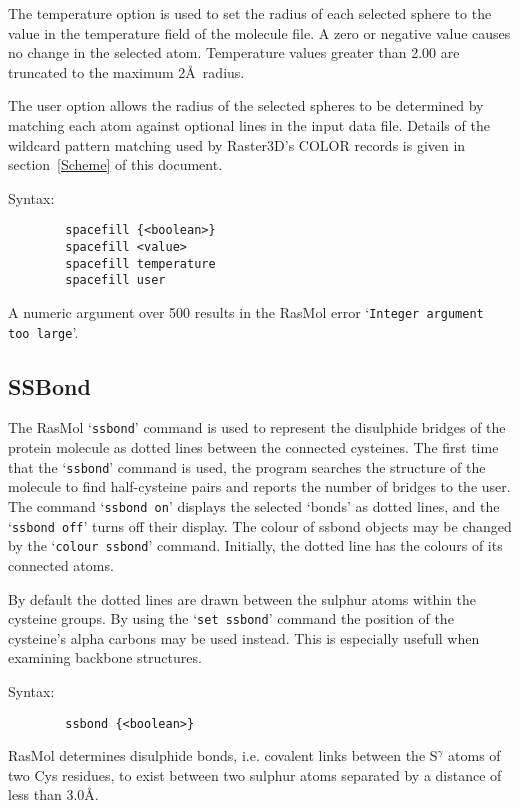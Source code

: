The temperature option is used to set the radius of each selected sphere
to the value in the temperature field of the molecule file. A zero or
negative value causes no change in the selected atom. Temperature values
greater than 2.00 are truncated to the maximum 2\AA\ radius.

\nocite{Lesk91,Iijima87}

The user option allows the radius of the selected spheres to be determined
by matching each atom against optional lines in the input data file. Details
of the wildcard pattern matching used by Raster3D's COLOR records is given 
in section~\ref{Scheme} of this document.

Syntax:
\begin{verbatim}
        spacefill {<boolean>}
        spacefill <value>
        spacefill temperature
        spacefill user
\end{verbatim}

A numeric argument over 500 results in the RasMol error `{\tt Integer 
argument too large}'.


\subsection{SSBond}
\label{CSSBond}

The RasMol `{\tt ssbond}' command is used to represent the disulphide bridges
of the protein molecule as dotted lines between the connected cysteines.
The first time that the `{\tt ssbond}' command is used, the program searches
the structure of the molecule to find half-cysteine pairs and reports the
number of bridges to the user. The command `{\tt ssbond on}' displays the 
selected `bonds' as dotted lines, and the `{\tt ssbond off}' turns off their
display. The colour of ssbond objects may be changed by the `{\tt colour
ssbond}' command. Initially, the dotted line has the colours of its 
connected atoms.

By default the dotted lines are drawn between the sulphur atoms within
the cysteine groups. By using the `{\tt set ssbond}' command the position of
the cysteine's alpha carbons may be used instead. This is especially
usefull when examining backbone structures.

Syntax:
\begin{verbatim}
        ssbond {<boolean>}
\end{verbatim}

RasMol determines disulphide bonds, i.e. covalent links between the 
S$^\gamma$ atoms of two Cys residues, to exist between two sulphur
atoms separated by a distance of less than 3.0\AA.


